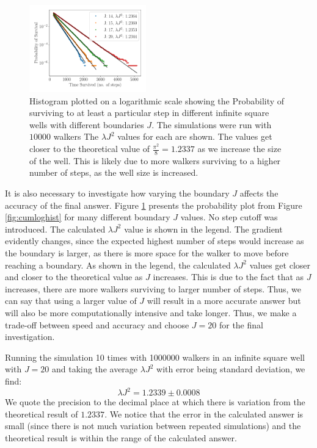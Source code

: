 \documentclass[journal]{IEEEtran}
\begin{document}
\begin{figure}[!ht]
  \begin{center}
    \includegraphics[width=0.45\textwidth]{images/multiplot.pdf}
    \caption{Histogram plotted on a logarithmic scale showing the Probability of
      surviving to at least a particular step in different infinite square wells
      with different boundaries $J$. The simulations were run with $10000$
      walkers The $\lambda J^2$ values for each are shown. The values get closer
      to the theoretical value of $\frac{\pi^2}{8} = 1.2337$ as we increase the
      size of the well. This is likely due to more walkers surviving to a higher
      number of steps, as the well size is increased.}
    \label{fig:multi_line_plot}
  \end{center}
\end{figure}

It is also necessary to investigate how varying the boundary $J$ affects the
accuracy of the final answer. Figure \ref{fig:multi_line_plot} presents the
probability plot from Figure \ref{fig:cumloghist} for many different boundary
$J$ values. No step cutoff was introduced. The calculated $\lambda J^2$ value is
shown in the legend. The gradient evidently changes, since the expected highest
number of steps would increase as the boundary is larger, as there is more
space for the walker to move before reaching a boundary. As shown in the legend,
the calculated $\lambda J^2$ values get closer and closer to the
theoretical value as $J$ increases. This is due to the fact that as $J$
increases, there are more walkers surviving to larger number of steps. Thus, we
can say that using a larger value of $J$ will result in a more accurate answer
but will also be more computationally intensive and take longer. Thus, we make a
trade-off between speed and accuracy and choose $J=20$ for the final
investigation.

Running the simulation 10 times with 1000000 walkers in an infinite square well
with $J=20$ and taking the average $\lambda J^2$ with error being standard
deviation, we find:
\begin{equation}
  \lambda J^2 = 1.2339 \pm 0.0008
  \nonumber
\end{equation}
We quote the precision to the decimal place at which there is variation from the
theoretical result of $1.2337$. We notice that the error in the calculated
answer is small (since there is not much variation between repeated simulations)
and the theoretical result is within the range of the calculated answer.
\end{document}

